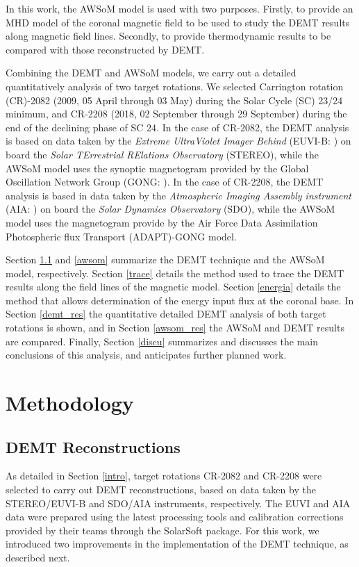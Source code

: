 \documentclass[namedreferences]{solarphysics}
\begin{document}
\begin{article}
{In this work, the AWSoM model is used with two purposes. Firstly, to provide an MHD model of the coronal magnetic field to be used to study the DEMT results along magnetic field lines. Secondly, to provide thermodynamic results to be compared with those reconstructed by DEMT.}

{Combining the DEMT and AWSoM models, we carry out a detailed quantitatively analysis of two target rotations. We selected Carrington rotation} (CR)-2082 (2009, 05 April through 03 May) during the Solar Cycle (SC) 23/24 minimum, and CR-2208 (2018, 02 September through 29 September) during {the end of the declining} phase of SC 24. {In the case of CR-2082, the DEMT analysis is based on data} taken by the \textit{Extreme UltraViolet Imager Behind} {(EUVI-B: \citealt{wuelser_2004})} on board the \textit{Solar TErrestrial RElations Observatory} {(STEREO), while the AWSoM model uses the synoptic magnetogram provided by the Global Oscillation Network Group (GONG: \citealt{gong}). In the case of CR-2208, the DEMT analysis is based in data taken} by the \textit{Atmospheric Imaging Assembly instrument} {(AIA: \citealt{lemen_2012})} on board the \textit{Solar Dynamics Observatory} {(SDO), while the AWSoM model uses the magnetogram provide by the Air Force Data Assimilation Photospheric flux Transport (ADAPT)-GONG model.}

Section \ref{demt} and \ref{awsom} {summarize the DEMT technique and the AWSoM model, respectively.} Section \ref{trace} {details} the method used to trace {the DEMT} results along the field lines of the magnetic model. Section \ref{energia} details {the method that allows determination of the energy input flux at the coronal base.} In Section \ref{demt_res} the quantitative {detailed DEMT analysis of both target rotations is shown,} and in Section \ref{awsom_res} the AWSoM and DEMT results are compared. {Finally, Section} \ref{discu} summarizes and discusses the main conclusions of this analysis, and anticipates further planned work. 

\section{Methodology}\label{meto}   

\subsection{{DEMT Reconstructions}}\label{demt}

{As detailed in Section \ref{intro}, target rotations CR-2082 and CR-2208 were selected to carry out DEMT reconstructions, based on data taken by the STEREO/EUVI-B and SDO/AIA instruments, respectively.} The EUVI and AIA data were prepared using the latest processing tools and calibration corrections provided by their teams through the SolarSoft package. For this work, we introduced two improvements in the implementation of the DEMT technique, as described next.


\end{article}
\end{document}
